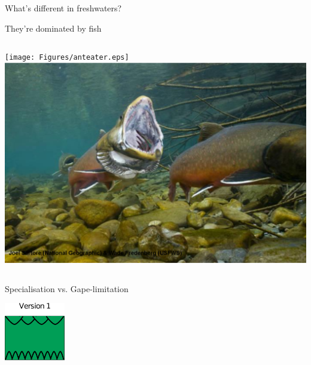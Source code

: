 \documentclass{beamer}
\begin{document}




  \begin{frame}{What's different in freshwaters?}
    \begin{block}{They're dominated by fish}

      \begin{columns}
      \column{.5in}
      \column{1.9in}
        \hfill
        \texttt{[image: Figures/anteater.eps]}
      \column{.2in}
      \column{1.9in}
        \includegraphics[width=.8\columnwidth]{Figures/trout.eps}
      \column{.5in}
      \end{columns}
    \end{block}
    
        \vspace{.15in}

    \begin{center}

        Specialisation vs. Gape-limitation

        \vspace{.15in}

        \includegraphics[height=1in]{Figures/version1.eps}

    \end{center}

  \end{frame}
\end{document}
